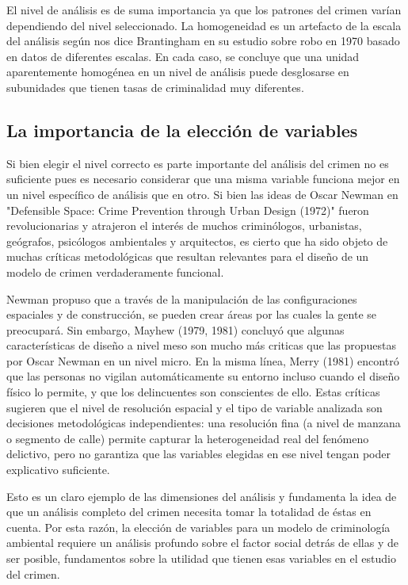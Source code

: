 El nivel de análisis es de suma importancia ya que los patrones del crimen varían dependiendo del nivel seleccionado. La homogeneidad es un artefacto de la escala del análisis según nos dice Brantingham en su estudio sobre robo en 1970 basado en datos de diferentes escalas. En cada caso, se concluye que una unidad aparentemente homogénea en un nivel de análisis puede desglosarse en subunidades que tienen tasas de criminalidad muy diferentes\cite{brantingham1976}.


\subsection{La importancia de la elección de variables}
Si bien elegir el nivel correcto es parte importante del análisis del crimen no es suficiente pues es necesario considerar que una misma variable funciona mejor en un nivel específico de análisis que en otro. Si bien las ideas de Oscar Newman en "Defensible Space: Crime Prevention through Urban Design (1972)" fueron revolucionarias y atrajeron el interés de muchos criminólogos, urbanistas, geógrafos, psicólogos ambientales y arquitectos\cite{brantingham1981}, es cierto que ha sido objeto de muchas críticas metodológicas que resultan relevantes para el diseño de un modelo de crimen verdaderamente funcional.

Newman propuso que a través de la manipulación de las configuraciones espaciales y de construcción, se pueden crear áreas por las cuales la gente se preocupará\cite[p.~206]{OscarNewman1973}. Sin embargo, Mayhew (1979, 1981) concluyó que algunas características de diseño a nivel meso son mucho más criticas que las propuestas por Oscar Newman en un nivel micro\cite{brantingham1981}. En la misma línea, Merry (1981) encontró que las personas no vigilan automáticamente su entorno incluso cuando el diseño físico lo permite, y que los delincuentes son conscientes de ello\cite{merry1981}. Estas críticas sugieren que el nivel de resolución espacial y el tipo de variable analizada son decisiones metodológicas independientes: una resolución fina (a nivel de manzana o segmento de calle) permite capturar la heterogeneidad real del fenómeno delictivo, pero no garantiza que las variables elegidas en ese nivel tengan poder explicativo suficiente.

Esto es un claro ejemplo de las dimensiones del análisis y fundamenta la idea de que un análisis completo del crimen necesita tomar la totalidad de éstas en cuenta\cite{brantingham1981}. Por esta razón, la elección de variables para un modelo de criminología ambiental requiere un análisis profundo sobre el factor social detrás de ellas y de ser posible, fundamentos sobre la utilidad que tienen esas variables en el estudio del crimen.


